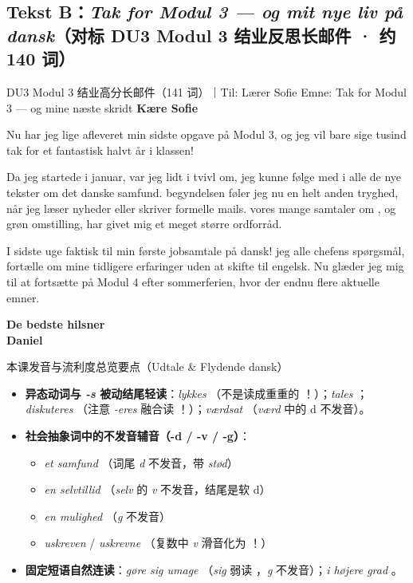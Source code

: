 \subsection*{Tekst B：\textit{Tak for Modul 3 --- og mit nye liv på dansk}（对标 DU3 Modul 3 结业反思长邮件 · 约 140 词）}

\begin{emailbox}{DU3 Modul 3 结业高分长邮件（141 词）｜Til: Lærer Sofie \quad Emne: Tak for Modul 3 --- og mine næste skridt}
\textbf{Kære Sofie}

Nu har jeg lige afleveret min sidste opgave på Modul 3, og jeg vil bare sige tusind tak for et fantastisk halvt år i klassen!

Da jeg startede i januar, var jeg lidt i tvivl om,  jeg kunne følge med i alle de nye tekster om det danske samfund.  begyndelsen føler jeg nu en helt anden tryghed, når jeg læser nyheder eller skriver formelle mails.  vores mange samtaler om ,  og grøn omstilling,  har givet mig et meget større ordforråd.

I sidste uge  faktisk  til min første jobsamtale på dansk!  jeg alle chefens spørgsmål,  fortælle om mine tidligere erfaringer uden at skifte til engelsk. Nu glæder jeg mig til at fortsætte på Modul 4 efter sommerferien, hvor der  endnu flere aktuelle emner.

\textbf{De bedste hilsner}\\
\textbf{Daniel}
\end{emailbox}

\begin{tipbox}{本课发音与流利度总览要点（Udtale \& Flydende dansk）}
\begin{itemize}
  \item \textbf{异态动词与 \textit{-s} 被动结尾轻读}：\textit{lykkes} （不是读成重重的 ！）；\textit{tales} ；\textit{diskuteres} （注意 \textit{-eres} 融合读 ！）；\textit{værdsat} （\textit{værd} 中的 d 不发音）。
  \item \textbf{社会抽象词中的不发音辅音（-d / -v / -g）}：
    \begin{itemize}
      \item \textit{et samfund} （词尾 \textit{d} 不发音，带 \textit{stød}）
      \item \textit{en selvtillid} （\textit{selv} 的 \textit{v} 不发音，结尾是软 d）
      \item \textit{en mulighed} （\textit{g} 不发音）
      \item \textit{uskreven}  / \textit{uskrevne} （复数中 \textit{v} 滑音化为 ！）
    \end{itemize}
  \item \textbf{固定短语自然连读}：\textit{gøre sig umage} （\textit{sig} 弱读 ，\textit{g} 不发音）；\textit{i højere grad} 。
\end{itemize}
\end{tipbox}

